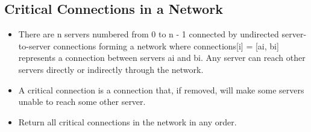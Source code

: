 \documentclass[9pt, b5paper]{article}
\begin{document}
\subsection{Critical Connections in a Network}
\label{sec-17-5}
\begin{itemize}
\item There are n servers numbered from 0 to n - 1 connected by undirected server-to-server connections forming a network where connections[i] = [ai, bi] represents a connection between servers ai and bi. Any server can reach other servers directly or indirectly through the network.
\item A critical connection is a connection that, if removed, will make some servers unable to reach some other server.
\item Return all critical connections in the network in any order.
\end{itemize}
\end{document}
